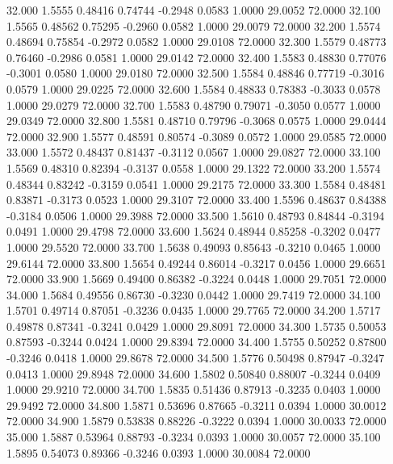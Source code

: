   32.000   1.5555   0.48416   0.74744  -0.2948   0.0583   1.0000  29.0052  72.0000
  32.100   1.5565   0.48562   0.75295  -0.2960   0.0582   1.0000  29.0079  72.0000
  32.200   1.5574   0.48694   0.75854  -0.2972   0.0582   1.0000  29.0108  72.0000
  32.300   1.5579   0.48773   0.76460  -0.2986   0.0581   1.0000  29.0142  72.0000
  32.400   1.5583   0.48830   0.77076  -0.3001   0.0580   1.0000  29.0180  72.0000
  32.500   1.5584   0.48846   0.77719  -0.3016   0.0579   1.0000  29.0225  72.0000
  32.600   1.5584   0.48833   0.78383  -0.3033   0.0578   1.0000  29.0279  72.0000
  32.700   1.5583   0.48790   0.79071  -0.3050   0.0577   1.0000  29.0349  72.0000
  32.800   1.5581   0.48710   0.79796  -0.3068   0.0575   1.0000  29.0444  72.0000
  32.900   1.5577   0.48591   0.80574  -0.3089   0.0572   1.0000  29.0585  72.0000
  33.000   1.5572   0.48437   0.81437  -0.3112   0.0567   1.0000  29.0827  72.0000
  33.100   1.5569   0.48310   0.82394  -0.3137   0.0558   1.0000  29.1322  72.0000
  33.200   1.5574   0.48344   0.83242  -0.3159   0.0541   1.0000  29.2175  72.0000
  33.300   1.5584   0.48481   0.83871  -0.3173   0.0523   1.0000  29.3107  72.0000
  33.400   1.5596   0.48637   0.84388  -0.3184   0.0506   1.0000  29.3988  72.0000
  33.500   1.5610   0.48793   0.84844  -0.3194   0.0491   1.0000  29.4798  72.0000
  33.600   1.5624   0.48944   0.85258  -0.3202   0.0477   1.0000  29.5520  72.0000
  33.700   1.5638   0.49093   0.85643  -0.3210   0.0465   1.0000  29.6144  72.0000
  33.800   1.5654   0.49244   0.86014  -0.3217   0.0456   1.0000  29.6651  72.0000
  33.900   1.5669   0.49400   0.86382  -0.3224   0.0448   1.0000  29.7051  72.0000
  34.000   1.5684   0.49556   0.86730  -0.3230   0.0442   1.0000  29.7419  72.0000
  34.100   1.5701   0.49714   0.87051  -0.3236   0.0435   1.0000  29.7765  72.0000
  34.200   1.5717   0.49878   0.87341  -0.3241   0.0429   1.0000  29.8091  72.0000
  34.300   1.5735   0.50053   0.87593  -0.3244   0.0424   1.0000  29.8394  72.0000
  34.400   1.5755   0.50252   0.87800  -0.3246   0.0418   1.0000  29.8678  72.0000
  34.500   1.5776   0.50498   0.87947  -0.3247   0.0413   1.0000  29.8948  72.0000
  34.600   1.5802   0.50840   0.88007  -0.3244   0.0409   1.0000  29.9210  72.0000
  34.700   1.5835   0.51436   0.87913  -0.3235   0.0403   1.0000  29.9492  72.0000
  34.800   1.5871   0.53696   0.87665  -0.3211   0.0394   1.0000  30.0012  72.0000
  34.900   1.5879   0.53838   0.88226  -0.3222   0.0394   1.0000  30.0033  72.0000
  35.000   1.5887   0.53964   0.88793  -0.3234   0.0393   1.0000  30.0057  72.0000
  35.100   1.5895   0.54073   0.89366  -0.3246   0.0393   1.0000  30.0084  72.0000
